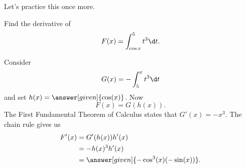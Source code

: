 \documentclass{ximera}
\begin{document}
Let's practice this once more.

\begin{example}
  Find the
  derivative of
  \[
  F(x) = \int_{\cos x}^5 t^3\d t.
  \]
  \begin{explanation}
    Consider
    \[
    G(x) = - \int_5^x t^3 \d t
    \]
    and set $h(x) = \answer[given]{\cos(x)}$. Now
    \[
    F(x) = G(h(x)).
    \]
    The First Fundamental Theorem of Calculus states that $G'(x) = -x^3$. The chain rule gives us
    \begin{align*}
      F'(x) &= G'(h(x))h'(x)\\
      &=-h(x)^3 h'(x)\\
      &=\answer[given]{-\cos^3(x) (-\sin(x))}.
    \end{align*}
  \end{explanation}
\end{example}
\end{document}
